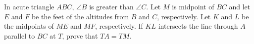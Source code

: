 In acute triangle $ABC$, $\angle{B}$ is greater than $\angle{C}$. Let $M$ is midpoint of $BC$ and let $E$ and $F$ be the feet of the altitudes from $B$ and $C$, respectively. Let $K$ and $L$ be the midpoints of $ME$ and $MF$, respectively. If $KL$ intersects the line through $A$ parallel to $BC$ at $T$, prove that $TA=TM$.
